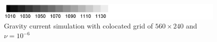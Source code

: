 \begin{figure}[htbp]
\begin{center}
\includegraphics[scale=0.55]{../figures/colocated/Fig9case/label.png}
    \caption{Gravity current simulation with colocated grid of $560 \times 240$ and $\nu=10^{-6}$}
    \label{fig:560-240-0375-VE-6-Surf0}
  \end{center}
\end{figure}

\cp

